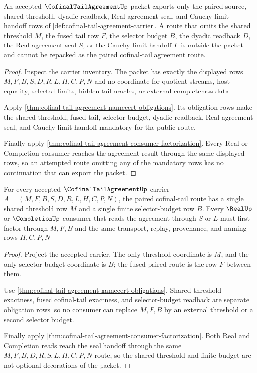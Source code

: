 \begin{theorem}
\label{thm:cofinal-tail-agreement-nonescape}
An accepted $\CofinalTailAgreementUp$ packet exports only the paired-source, shared-threshold, dyadic-readback, Real-agreement-seal, and Cauchy-limit handoff rows of \autoref{def:cofinal-tail-agreement-carrier}. A route that omits the shared threshold $M$, the fused tail row $F$, the selector budget $B$, the dyadic readback $D$, the Real agreement seal $S$, or the Cauchy-limit handoff $L$ is outside the packet and cannot be repacked as the paired cofinal-tail agreement route.
\end{theorem}
\begin{proof}
Inspect the carrier inventory. The packet has exactly the displayed rows $M,F,B,S,D,R,L,H,C,P,N$ and no coordinate for quotient streams, host equality, selected limits, hidden tail oracles, or external completeness data.

Apply \autoref{thm:cofinal-tail-agreement-namecert-obligations}. Its obligation rows make the shared threshold, fused tail, selector budget, dyadic readback, Real agreement seal, and Cauchy-limit handoff mandatory for the public route.

Finally apply \autoref{thm:cofinal-tail-agreement-consumer-factorization}. Every Real or Completion consumer reaches the agreement result through the same displayed rows, so an attempted route omitting any of the mandatory rows has no continuation that can export the packet.
\end{proof}

\begin{theorem}
\label{thm:cofinal-tail-agreement-shared-threshold-budget}
For every accepted $\CofinalTailAgreementUp$ carrier $A=(M,F,B,S,D,R,L,H,C,P,N)$, the paired cofinal-tail route has a single shared threshold row $M$ and a single finite selector-budget row $B$. Every $\RealUp$ or $\CompletionUp$ consumer that reads the agreement through $S$ or $L$ must first factor through $M,F,B$ and the same transport, replay, provenance, and naming rows $H,C,P,N$.
\end{theorem}
\begin{proof}
Project the accepted carrier. The only threshold coordinate is $M$, and the only selector-budget coordinate is $B$; the fused paired route is the row $F$ between them.

Use \autoref{thm:cofinal-tail-agreement-namecert-obligations}. Shared-threshold exactness, fused cofinal-tail exactness, and selector-budget readback are separate obligation rows, so no consumer can replace $M,F,B$ by an external threshold or a second selector budget.

Finally apply \autoref{thm:cofinal-tail-agreement-consumer-factorization}. Both Real and Completion reads reach the seal handoff through the same $M,F,B,D,R,S,L,H,C,P,N$ route, so the shared threshold and finite budget are not optional decorations of the packet.
\end{proof}

